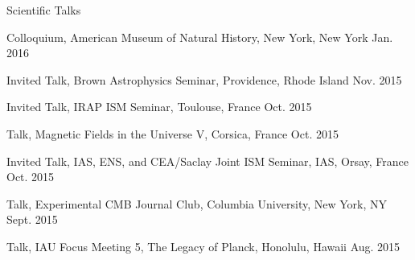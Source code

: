 \documentclass{resume_clark} %
\begin{document}
\begin{rSection}{Scientific Talks}
\begin{etaremune}[itemsep=-1.8mm]
\item Colloquium, American Museum of Natural History, New York, New York \hfill {Jan. 2016}

\item Invited Talk, Brown Astrophysics Seminar, Providence, Rhode Island \hfill {Nov. 2015}

\item Invited Talk, IRAP ISM Seminar, Toulouse, France \hfill{Oct. 2015}

\item Talk, Magnetic Fields in the Universe V, Corsica, France \hfill {Oct. 2015}

\item Invited Talk, IAS, ENS, and CEA/Saclay Joint ISM Seminar, IAS, Orsay, France \hfill {Oct. 2015}

\item Talk, Experimental CMB Journal Club, Columbia University, New York, NY \hfill {Sept. 2015}

\item Talk, IAU Focus Meeting 5, The Legacy of Planck, Honolulu, Hawaii \hfill {Aug. 2015}


\end{etaremune}
\end{rSection}
\end{document}
